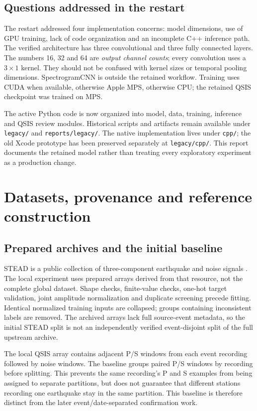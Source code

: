 \documentclass[a4paper,11pt,oneside]{article}
\newcommand{\code}[1]{\nolinkurl{#1}}
\begin{document}
\subsection{Questions addressed in the restart}
The restart addressed four implementation concerns: model dimensions, use of
GPU training, lack of code organization and an incomplete C++ inference path.
The verified architecture has three convolutional and three fully connected
layers. The numbers 16, 32 and 64 are \emph{output channel counts}; every
convolution uses a $3\times1$ kernel. They should not be confused with kernel
sizes or temporal pooling dimensions. SpectrogramCNN is outside the retained
workflow. Training uses CUDA when available, otherwise Apple MPS, otherwise
CPU; the retained QSIS checkpoint was trained on MPS.

The active Python code is now organized into model, data, training, inference
and QSIS review modules. Historical scripts and artifacts remain available
under \code{legacy/} and \code{reports/legacy/}. The native implementation lives
under \code{cpp/}; the old Xcode prototype has been preserved separately at
\code{legacy/cpp/}. This report documents the retained model rather than treating
every exploratory experiment as a production change.

\section{Datasets, provenance and reference construction}
\subsection{Prepared archives and the initial baseline}
STEAD is a public collection of three-component earthquake and noise signals
\cite{8871127}. The local experiment uses prepared arrays derived from that
resource, not the complete global dataset. Shape checks, finite-value checks,
one-hot target validation, joint amplitude normalization and duplicate
screening precede fitting. Identical normalized training inputs are collapsed;
groups containing inconsistent labels are removed. The archived arrays lack
full source-event metadata, so the initial STEAD split is not an independently
verified event-disjoint split of the full upstream archive.

The local QSIS array contains adjacent P/S windows from each event recording
followed by noise windows. The baseline groups paired P/S windows by recording
before splitting. This prevents the same recording's P and S examples from
being assigned to separate partitions, but does not guarantee that different
stations recording one earthquake stay in the same partition. This baseline
is therefore distinct from the later event/date-separated confirmation work.
\end{document}
